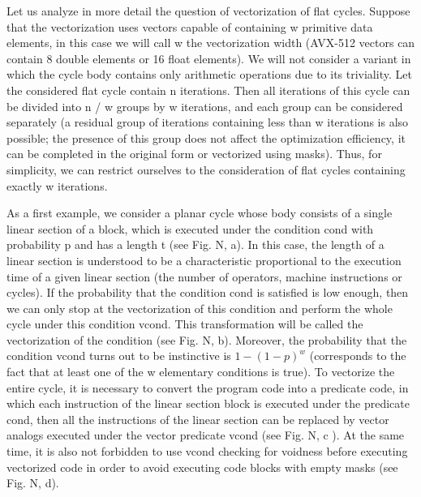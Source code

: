 \documentclass[
11pt,%
tightenlines,%
twoside,%
onecolumn,%
nofloats,%
nobibnotes,%
nofootinbib,%
superscriptaddress,%
noshowpacs,%
centertags]%
{revtex4}
\begin{document}
Let us analyze in more detail the question of vectorization of flat cycles. Suppose that the vectorization uses vectors capable of containing w primitive data elements, in this case we will call w the vectorization width (AVX-512 vectors can contain 8 double elements or 16 float elements). We will not consider a variant in which the cycle body contains only arithmetic operations due to its triviality. Let the considered flat cycle contain n iterations. Then all iterations of this cycle can be divided into n / w groups by w iterations, and each group can be considered separately (a residual group of iterations containing less than w iterations is also possible; the presence of this group does not affect the optimization efficiency, it can be completed in the original form or vectorized using masks). Thus, for simplicity, we can restrict ourselves to the consideration of flat cycles containing exactly w iterations.

As a first example, we consider a planar cycle whose body consists of a single linear section of a block, which is executed under the condition cond with probability p and has a length t (see Fig. N, a). In this case, the length of a linear section is understood to be a characteristic proportional to the execution time of a given linear section (the number of operators, machine instructions or cycles). If the probability that the condition cond is satisfied is low enough, then we can only stop at the vectorization of this condition and perform the whole cycle under this condition vcond. This transformation will be called the vectorization of the condition (see Fig. N, b). Moreover, the probability that the condition vcond turns out to be instinctive is $1 - (1 - p) ^ w$ (corresponds to the fact that at least one of the w elementary conditions is true). To vectorize the entire cycle, it is necessary to convert the program code into a predicate code, in which each instruction of the linear section block is executed under the predicate cond, then all the instructions of the linear section can be replaced by vector analogs executed under the vector predicate vcond (see Fig. N, c ). At the same time, it is also not forbidden to use vcond checking for voidness before executing vectorized code in order to avoid executing code blocks with empty masks (see Fig. N, d).
\end{document}
